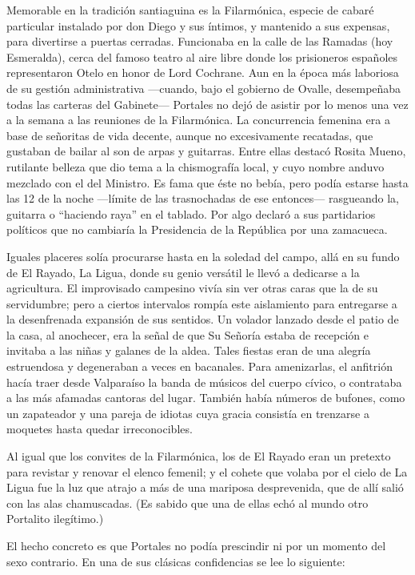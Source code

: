 \documentclass[10pt,twoside,openright]{memoir}
\begin{document}
Memorable en la tradición santiaguina es la Filarmónica, especie de
cabaré particular instalado por don Diego y sus íntimos, y mantenido a
sus expensas, para divertirse a puertas cerradas. Funcionaba en la calle
de las Ramadas (hoy Esmeralda), cerca del famoso teatro al aire libre
donde los prisioneros españoles representaron Otelo en honor de Lord
Cochrane. Aun en la época más laboriosa de su gestión
administrativa ---cuando, bajo el
gobierno de Ovalle, desempeñaba todas las carteras del Gabinete---
Portales no dejó de asistir por lo menos una vez a la
semana a las reuniones de la
Filarmónica. La concurrencia femenina era a base de señoritas de vida
decente, aunque no excesivamente recatadas, que gustaban de bailar al
son de arpas y guitarras. Entre ellas destacó Rosita Mueno, rutilante
belleza que dio tema a la chismografía local, y cuyo nombre anduvo
mezclado con el del Ministro. Es fama que éste no bebía, pero podía
estarse hasta las 12 de la noche ---límite de las trasnochadas de ese
entonces--- rasgueando la, guitarra o ``haciendo raya'' en el tablado. Por
algo declaró a sus partidarios políticos que no cambiaría la Presidencia
de la República por una zamacueca.

Iguales placeres solía procurarse hasta en la soledad del campo, allá en
su fundo de El Rayado, La Ligua,
donde su genio versátil le llevó a dedicarse a la agricultura. El
improvisado campesino vivía sin ver otras caras que la de su
servidumbre; pero a ciertos intervalos rompía este aislamiento para
entregarse a la desenfrenada
expansión de sus sentidos. Un volador lanzado desde el patio de la casa,
al anochecer, era la señal de que Su Señoría estaba de recepción e
invitaba a las niñas y galanes de la aldea. Tales fiestas eran de una
alegría estruendosa y degeneraban a veces en bacanales. Para
amenizarlas, el anfitrión hacía traer desde Valparaíso la banda de
músicos del cuerpo cívico, o contrataba a las más afamadas cantoras del
lugar. También había números de bufones, como un zapateador y una pareja
de idiotas cuya gracia consistía en trenzarse a moquetes hasta quedar
irreconocibles.

Al igual que los convites de la Filarmónica, los
de El Rayado eran un pretexto para
revistar y renovar el elenco femenil; y el cohete que volaba por el
cielo de La Ligua fue la luz que atrajo a más de una mariposa
desprevenida, que de allí salió con las alas chamuscadas. (Es sabido que
una de ellas echó al mundo otro Portalito ilegítimo.)

El hecho concreto es que Portales no podía prescindir ni por un momento
del sexo contrario. En una de sus clásicas confidencias se lee lo
siguiente:
\end{document}
